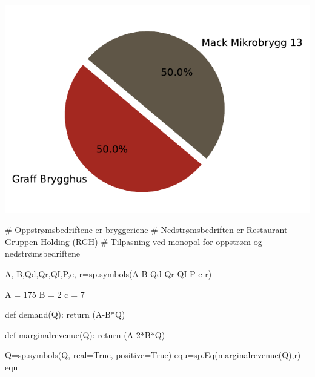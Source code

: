 \documentclass[
  12pt,
  a4paper,
  DIV=11,
  numbers=noendperiod]{scrartcl}
\newenvironment{Shaded}{\begin{snugshade}}{\end{snugshade}}
\newcommand{\CommentTok}[1]{\textcolor[rgb]{0.37,0.37,0.37}{#1}}
\newcommand{\ControlFlowTok}[1]{\textcolor[rgb]{0.00,0.23,0.31}{#1}}
\newcommand{\DecValTok}[1]{\textcolor[rgb]{0.68,0.00,0.00}{#1}}
\newcommand{\KeywordTok}[1]{\textcolor[rgb]{0.00,0.23,0.31}{#1}}
\newcommand{\NormalTok}[1]{\textcolor[rgb]{0.00,0.23,0.31}{#1}}
\newcommand{\OperatorTok}[1]{\textcolor[rgb]{0.37,0.37,0.37}{#1}}
\newcommand{\StringTok}[1]{\textcolor[rgb]{0.13,0.47,0.30}{#1}}
\newcommand{\VariableTok}[1]{\textcolor[rgb]{0.07,0.07,0.07}{#1}}
\begin{document}
\includegraphics{Kandidatnummer_30_mappeoppgave_2_SOK_2030_files/figure-pdf/cell-47-output-1.pdf}

\begin{Shaded}
\begin{Highlighting}[]
\CommentTok{\# Oppstrømsbedriftene er bryggeriene}
\CommentTok{\# Nedstrømsbedriften er Restaurant Gruppen Holding (RGH)}
\CommentTok{\# Tilpasning ved monopol for oppstrøm og nedstrømsbedriftene}


\NormalTok{A, B,Qd,Qr,QI,P,c, r}\OperatorTok{=}\NormalTok{sp.symbols(}\StringTok{\textquotesingle{}A B Qd Qr QI P c r\textquotesingle{}}\NormalTok{)}


\NormalTok{A }\OperatorTok{=} \DecValTok{175}
\NormalTok{B }\OperatorTok{=} \DecValTok{2}
\NormalTok{c }\OperatorTok{=} \DecValTok{7}

\KeywordTok{def}\NormalTok{ demand(Q):}
    \ControlFlowTok{return}\NormalTok{ (A}\OperatorTok{{-}}\NormalTok{B}\OperatorTok{*}\NormalTok{Q)}

\KeywordTok{def}\NormalTok{ marginalrevenue(Q):}
    \ControlFlowTok{return}\NormalTok{ (A}\OperatorTok{{-}}\DecValTok{2}\OperatorTok{*}\NormalTok{B}\OperatorTok{*}\NormalTok{Q)}
\end{Highlighting}
\end{Shaded}

\begin{Shaded}
\begin{Highlighting}[]
\NormalTok{Q}\OperatorTok{=}\NormalTok{sp.symbols(}\StringTok{\textquotesingle{}Q\textquotesingle{}}\NormalTok{, real}\OperatorTok{=}\VariableTok{True}\NormalTok{, positive}\OperatorTok{=}\VariableTok{True}\NormalTok{)}
\NormalTok{equ}\OperatorTok{=}\NormalTok{sp.Eq(marginalrevenue(Q),r)}
\NormalTok{equ}
\end{Highlighting}
\end{Shaded}
\end{document}
